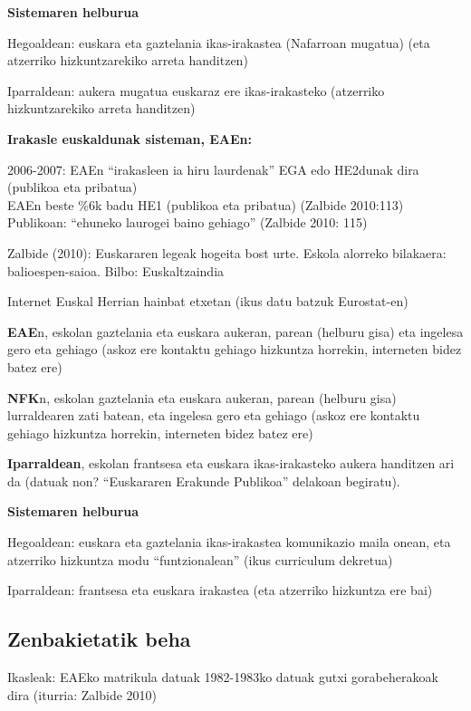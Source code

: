 \documentclass[
]{book}
\providecommand{\tightlist}{%
  \setlength{\itemsep}{0pt}\setlength{\parskip}{0pt}}
\begin{document}
\textbf{Sistemaren helburua}

Hegoaldean: euskara eta gaztelania ikas-irakastea (Nafarroan mugatua) (eta atzerriko hizkuntzarekiko arreta handitzen)

Iparraldean: aukera mugatua euskaraz ere ikas-irakasteko (atzerriko hizkuntzarekiko arreta handitzen)

\textbf{Irakasle euskaldunak sisteman, EAEn:}

2006-2007: EAEn ``irakasleen ia hiru laurdenak'' EGA edo HE2dunak dira (publikoa eta pribatua)\\
EAEn beste \%6k badu HE1 (publikoa eta pribatua) (Zalbide 2010:113)
Publikoan: ``ehuneko laurogei baino gehiago'' (Zalbide 2010: 115)

Zalbide (2010): Euskararen legeak hogeita bost urte. Eskola alorreko bilakaera: balioespen-saioa. Bilbo: Euskaltzaindia

\begin{description}
\tightlist
\item[2014]
Internet Euskal Herrian hainbat etxetan (ikus datu batzuk Eurostat-en)

\textbf{EAE}n, eskolan gaztelania eta euskara aukeran, parean (helburu gisa) eta ingelesa gero eta gehiago (askoz ere kontaktu gehiago hizkuntza horrekin, interneten bidez batez ere)

\textbf{NFK}n, eskolan gaztelania eta euskara aukeran, parean (helburu gisa) lurraldearen zati batean, eta ingelesa gero eta gehiago (askoz ere kontaktu gehiago hizkuntza horrekin, interneten bidez batez ere)

\textbf{Iparraldean}, eskolan frantsesa eta euskara ikas-irakasteko aukera handitzen ari da (datuak non? ``Euskararen Erakunde Publikoa'' delakoan begiratu).
\end{description}

\textbf{Sistemaren helburua}

Hegoaldean: euskara eta gaztelania ikas-irakastea komunikazio maila onean, eta atzerriko hizkuntza modu ``funtzionalean'' (ikus curriculum dekretua)

Iparraldean: frantsesa eta euskara irakastea (eta atzerriko hizkuntza ere bai)

\hypertarget{zenbakietatik-beha}{%
\subsection{Zenbakietatik beha}\label{zenbakietatik-beha}}

Ikasleak: EAEko matrikula datuak
1982-1983ko datuak gutxi gorabeherakoak dira (iturria: Zalbide 2010)
\end{document}
